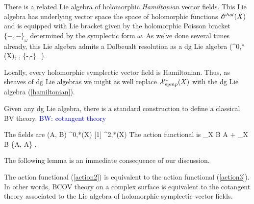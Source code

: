 \documentclass[10pt]{amsart}
\def\brian{\textcolor{blue}{BW: }\textcolor{blue}}
\begin{document}
There is a related Lie algebra of holomorphic {\em Hamiltonian} vector fields. 
This Lie algebra has underlying vector space the space of holomorphic functions $\mathscr O^{hol}(X)$ and is equipped with Lie bracket given by the holomorphic Poisson bracket $\{-,-\}_\omega$ determined by the symplectic form $\omega$. 
As we've done several times already, this Lie algebra admits a Dolbeualt resolution as a dg Lie algebra 
\be\label{hamiltonian}
\left(\Omega^{0,*}(X), \dbar, \{-,-\}_\omega \right).
\ee

Locally, every holomorphic symplectic vector field is Hamiltonian. 
Thus, as sheaves of dg Lie algebras we might as well replace $\mathcal X_{symp}^{*}(X)$ with the dg Lie algebra (\ref{hamiltonian}). 

Given any dg Lie algebra, there is a standard construction to define a classical BV theory. \brian{cotangent theory}

The fields are
\ben
(A, B) \in \Omega^{0,*}(X) [1] \oplus \Omega^{2,*}(X) 
\een
The action functional is
\be\label{action3}
\int_X B \dbar A +  \int_X B \{A, A\} .
\ee

The following lemma is an immediate consequence of our discussion.

\begin{lem} 
The action functional (\ref{action2}) is equivalent to the action functional (\ref{action3}).
In other words, BCOV theory on a complex surface is equivalent to the cotangent theory associated to the Lie algebra of holomorphic symplectic vector fields.
\end{lem}
\end{document}
